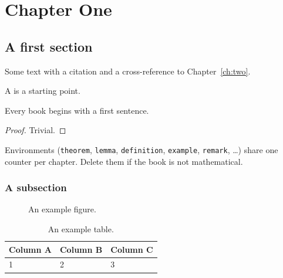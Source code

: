 \chapter{Chapter One}\label{ch:one}

\section{A first section}\label{sec:one-first}

Some text with a citation \cite{example2020} and a cross-reference to
Chapter~\ref{ch:two}. 

\begin{definition}\label{def:example}
  A  is a starting point.
\end{definition}

\begin{theorem}\label{thm:example}
  Every book begins with a first sentence.
\end{theorem}
\begin{proof}
  Trivial. \qedfilledtext
\end{proof}

\begin{remark}
  Environments (\texttt{theorem}, \texttt{lemma}, \texttt{definition},
  \texttt{example}, \texttt{remark}, \dots) share one counter per chapter.
  Delete them if the book is not mathematical.
\end{remark}

\subsection{A subsection}

\begin{figure}[!b]
  \centering
  \caption{An example figure.}\label{fig:example}
\end{figure}

\begin{table}[!t]
  \centering
  \begin{tabular}{lll}
    \toprule
    Column A & Column B & Column C \\
    \midrule
    1 & 2 & 3 \\
    \bottomrule
  \end{tabular}
  \caption{An example table.}\label{tab:example}
\end{table}
